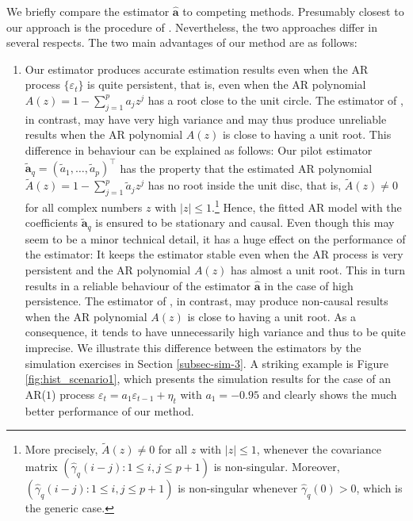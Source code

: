 We briefly compare the estimator $\widehat{\boldsymbol{a}}$ to competing methods. Presumably closest to our approach is the procedure of \cite{Hall2003}. Nevertheless, the two approaches differ in several respects. The two main advantages of our method are as follows: 
\begin{enumerate}[label=(\alph*),leftmargin=0.7cm]
\item Our estimator produces accurate estimation results even when the AR process $\{\varepsilon_t\}$ is quite persistent, that is, even when the AR polynomial $A(z) = 1 - \sum_{j=1}^p a_j z^j$ has a root close to the unit circle. The estimator of \cite{Hall2003}, in contrast, may have very high variance and may thus produce unreliable results when the AR polynomial $A(z)$ is close to having a unit root. This difference in behaviour can be explained as follows: Our pilot estimator $\widetilde{\boldsymbol{a}}_q = (\widetilde{a}_1,\ldots,\widetilde{a}_p)^\top$ has the property that the estimated AR polynomial $\widetilde{A}(z) = 1 - \sum_{j=1}^p \widetilde{a}_j z^j$ has no root inside the unit disc, that is, $\widetilde{A}(z) \ne 0$ for all complex numbers $z$ with $|z| \le 1$.\footnote{More precisely, $\widetilde{A}(z) \ne 0$ for all $z$ with $|z| \le 1$, whenever the covariance matrix $(\widehat{\gamma}_q(i-j): 1 \le i,j \le p+1)$ is non-singular. Moreover, $(\widehat{\gamma}_q(i-j): 1 \le i,j \le p+1)$ is non-singular whenever $\widehat{\gamma}_q(0) > 0$, which is the generic case.} Hence, the fitted AR model with the coefficients $\widetilde{\boldsymbol{a}}_q$ is ensured to be stationary and causal. Even though this may seem to be a minor technical detail, it has a huge effect on the performance of the estimator: It keeps the estimator stable even when the AR process is very persistent and the AR polynomial $A(z)$ has almost a unit root. This in turn results in a reliable behaviour of the estimator $\widehat{\boldsymbol{a}}$ in the case of high persistence. The estimator of \cite{Hall2003}, in contrast, may produce non-causal results when the AR polynomial $A(z)$ is close to having a unit root. As a consequence, it tends to have unnecessarily high variance and thus to be quite imprecise. We illustrate this difference between the estimators by the simulation exercises in Section \ref{subsec-sim-3}. A striking example is Figure \ref{fig:hist_scenario1}, which presents the simulation results for the case of an AR($1$) process $\varepsilon_t = a_1 \varepsilon_{t-1} + \eta_t$ with $a_1 = -0.95$ and clearly shows the much better performance of our method.  

\end{enumerate}
